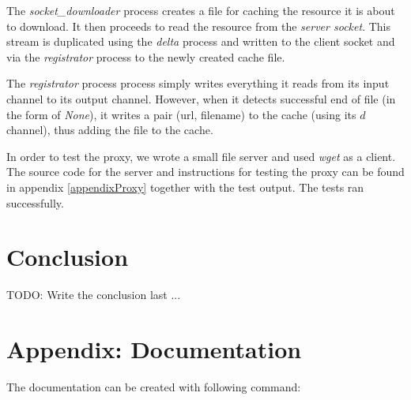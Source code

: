 \documentclass[a4paper,12pt]{article}
\begin{document}
The \emph{socket\_downloader} process creates a file for caching the resource
it is about to download. It then proceeds to read the resource from the
\emph{server socket}. This stream is duplicated using the \emph{delta} process
and written to the client socket and via the \emph{registrator} process to the
newly created cache file. 

The \emph{registrator} process process simply writes everything it reads from
its input channel to its output channel. However, when it detects successful
end of file (in the form of \emph{None}), it writes a pair (url, filename) to
the cache (using its $d$ channel), thus adding the file to the cache.

In order to test the proxy, we wrote a small file server and used \emph{wget}
as a client. The source code for the server and instructions for testing the
proxy can be found in appendix \ref{appendixProxy} together with the test
output. The tests ran successfully.

\newpage
\section{Conclusion}
\label{conclusion}

TODO: Write the conclusion last ...





\appendix
\newpage
\section{Appendix: Documentation}
\label{appendixDoc}
The documentation can be created with following command:
\end{document}
